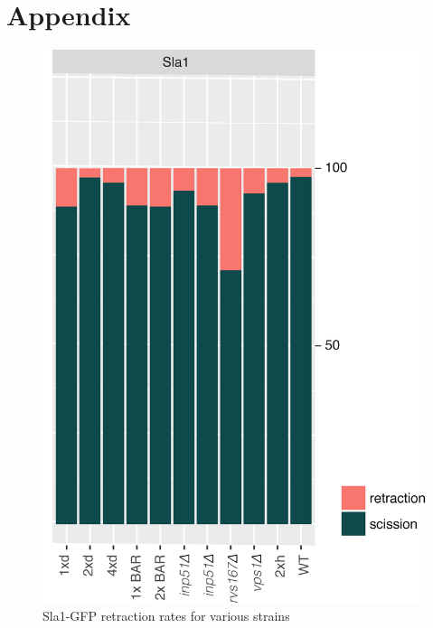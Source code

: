 \chapter{Appendix} %
\pagestyle{plain}
\label{Ch:Appendix}


\begin{figure}[H]
	\centering
	\vspace{5cm}
\includegraphics[scale=1]{figures/appendix/retraction_rates_all}
\caption[Scission failure rates]{Sla1-GFP retraction rates for various strains}
\end{figure}


